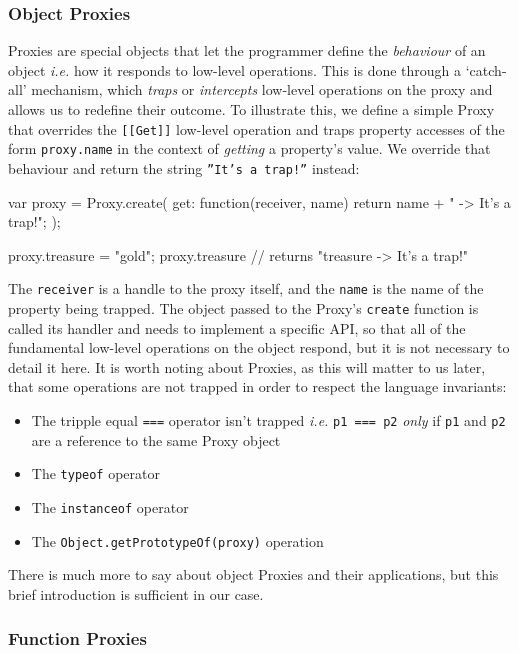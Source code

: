 \subsubsection{Object Proxies}
Proxies are special objects that let the programmer define the \emph{behaviour} of an object \emph{i.e.} how it responds to low-level operations. This is done through a `catch-all' mechanism, which \emph{traps} or \emph{intercepts} low-level operations on the proxy and allows us to redefine their outcome. To illustrate this, we define a simple Proxy that overrides the \texttt{[[Get]]} low-level operation and traps property accesses of the form \texttt{proxy.name} in the context of \emph{getting} a property's value. We override that behaviour and return the string \texttt{''It's a trap!''} instead:

\begin{code}
var proxy = Proxy.create({
  get: function(receiver, name) {
    return name + " -> It's a trap!";
  }
});

proxy.treasure = "gold";
proxy.treasure // returns "treasure -> It's a trap!"
\end{code}

The \texttt{receiver} is a handle to the proxy itself, and the \texttt{name} is the name of the property being trapped. The object passed to the Proxy's \texttt{create} function is called its handler and needs to implement a specific API, so that all of the fundamental low-level operations on the object respond, but it is not necessary to detail it here. It is worth noting about Proxies, as this will matter to us later, that some operations are not trapped in order to respect the language invariants:

\begin{itemize}
   \item The tripple equal \texttt{===} operator isn't trapped \emph{i.e.} \texttt{p1 === p2} \emph{only} if \texttt{p1} and \texttt{p2} are a reference to the same Proxy object
   \item The \texttt{typeof} operator
   \item The \texttt{instanceof} operator
   \item The \texttt{Object.getPrototypeOf(proxy)} operation
\end{itemize}

There is much more to say about object Proxies and their applications, but this brief introduction is sufficient in our case.

\subsubsection{Function Proxies}

